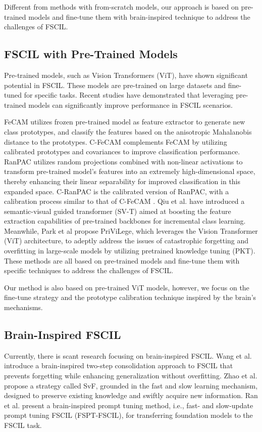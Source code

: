 Different from methods with from-scratch models, our approach is based on pre-trained models and fine-tune them with  brain-inspired technique to address the challenges of FSCIL.
\subsection{FSCIL with Pre-Trained Models}
Pre-trained models, such as Vision Transformers (ViT), have shown significant potential in FSCIL. These models are pre-trained on large datasets and fine-tuned for specific tasks. Recent studies have demonstrated that leveraging pre-trained models can significantly improve performance in FSCIL scenarios. 

FeCAM \cite{goswami2024fecam} utilizes frozen pre-trained model as feature extractor to generate new class prototypes, and classify the features based on the anisotropic Mahalanobis distance to the prototypes. C-FeCAM \cite{goswami2024calibrating} complements FeCAM \cite{goswami2024fecam} by utilizing calibrated prototypes and covariances to improve classification performance. RanPAC \cite{mcdonnell2024ranpac} utilizes random projections combined with non-linear activations to transform pre-trained model's features into an extremely high-dimensional space, thereby enhancing their linear separability for improved classification in this expanded space. C-RanPAC \cite{goswami2024calibrating} is the calibrated version of RanPAC, with a calibration process similar to that of C-FeCAM \cite{goswami2024calibrating}. Qiu et al. \cite{qiu2023semantic} have introduced a semantic-visual guided transformer (SV-T) aimed at boosting the feature extraction capabilities of pre-trained backbones for incremental class learning. Meanwhile, Park et al \cite{park2024pre} propose PriViLege, which leverages the Vision Transformer (ViT) architecture, to adeptly address the issues of catastrophic forgetting and overfitting in large-scale models by utilizing pretrained knowledge tuning (PKT). These methods are all based on pre-trained models and fine-tune them with specific techniques to address the challenges of FSCIL. 

Our method is also based on pre-trained ViT models, however, we focus on the fine-tune strategy and the prototype calibration technique inspired by the brain's mechanisms. 
\subsection{Brain-Inspired FSCIL}
Currently, there is scant research focusing on brain-inspired FSCIL. Wang et al. \cite{wang2021few} introduce a brain-inspired two-step consolidation approach to FSCIL that prevents forgetting while enhancing generalization without overfitting. Zhao et al. \cite{zhao2021mgsvf} propose a strategy called SvF, grounded in the fast and slow learning mechanism, designed to preserve existing knowledge and swiftly acquire new information. Ran et al. \cite{ran2024brain} present a brain-inspired prompt tuning method, i.e., fast- and slow-update prompt tuning FSCIL (FSPT-FSCIL), for transferring foundation models to the FSCIL task. 

